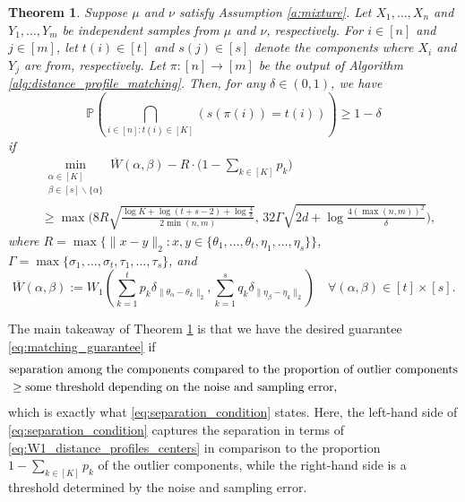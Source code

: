 \documentclass[11pt,letterpaper]{article}
\newtheorem{theorem}{Theorem} %
\theoremstyle{definition}
\numberwithin{equation}{section}
\renewcommand{\P}{\mathbb{P}}
\begin{document}
\begin{theorem}
    \label{thm:outlier_robustness}
    Suppose $\mu$ and $\nu$ satisfy Assumption \ref{a:mixture}. Let $X_1, \ldots, X_n$ and $Y_1, \ldots, Y_m$ be independent samples from $\mu$ and $\nu$, respectively. For $i \in [n]$ and $j \in [m]$, let $t(i) \in [t]$ and $s(j) \in [s]$ denote the components where $X_i$ and $Y_j$ are from, respectively. Let $\pi \colon [n] \to [m]$ be the output of Algorithm \ref{alg:distance_profile_matching}. Then, for any $\delta \in (0, 1)$, we have
    \begin{equation}
        \label{eq:matching_guarantee}
        \P\left(\bigcap_{i \in [n] : t(i) \in [K]} (s(\pi(i)) = t(i))\right) \ge 1 - \delta
    \end{equation}
    if
    \begin{equation}
        \label{eq:separation_condition}
        \begin{split}
            & \min_{\substack{\alpha \in [K] \\ \beta \in [s] \backslash \{\alpha\}}} \overline{W}(\alpha, \beta) - R \cdot \bigg(1 - \sum_{k \in [K]} p_k \bigg) \\
            & \ge \max\bigg(8 R \sqrt{\frac{\log K +\log (t + s - 2) + \log \tfrac{4}{\delta}}{2 \min(n, m)}}, \, 32 \Gamma \sqrt{2 d + \log \frac{4 (\max(n, m))^2}{\delta}}\bigg),
        \end{split}
    \end{equation}
    where $R = \max\{\|x - y\|_2 : x, y \in \{\theta_1, \ldots, \theta_t, \eta_1, \ldots, \eta_s\}\}$, $\Gamma = \max\{\sigma_1, \ldots, \sigma_t, \tau_1, \ldots, \tau_s\}$, and
    \begin{equation}
        \label{eq:W1_distance_profiles_centers}
        \overline{W}(\alpha, \beta) := W_1\left(\sum_{k = 1}^{t} p_k \delta_{\|\theta_{\alpha} - \theta_k\|_2}, \sum_{k = 1}^{s} q_k \delta_{\|\eta_{\beta} - \eta_k\|_2}\right) \quad \forall (\alpha, \beta) \in [t] \times [s].
    \end{equation}
\end{theorem}

The main takeaway of Theorem \ref{thm:outlier_robustness} is that we have the desired guarantee \eqref{eq:matching_guarantee} if
\begin{equation*}
    \begin{split}
        & \text{\textit{separation among the components compared to the proportion of outlier components}} \\
        & \ge \text{\textit{some threshold depending on the noise and sampling error}},
    \end{split}
\end{equation*}
which is exactly what \eqref{eq:separation_condition} states. Here, the left-hand side of \eqref{eq:separation_condition} captures the separation in terms of \eqref{eq:W1_distance_profiles_centers} in comparison to the proportion $1 - \sum_{k \in [K]} p_k$ of the outlier components, while the right-hand side is a threshold 
determined by the noise and sampling error. 
\end{document}
